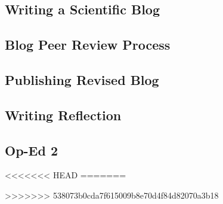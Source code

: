 \documentclass{article}\usepackage[]{graphicx}\usepackage[]{color}
\begin{document}

%

\subsection{Writing a Scientific Blog}




\subsection{Blog Peer Review Process}




\subsection{Publishing Revised Blog}




\subsection{Writing Reflection}



\subsection{Op-Ed 2}

<<<<<<< HEAD
=======



>>>>>>> 538073b0cda7f615009b8e70d4f84d82070a3b18




%
\end{document}
